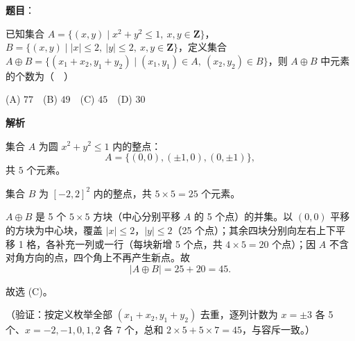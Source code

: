 \begin{answer}

\textbf{题目}：

已知集合 \(A=\{(x,y)\mid x^2+y^2\leqslant1,\ x,y\in\mathbf{Z}\}\)，\(B=\{(x,y)\mid |x|\leqslant2,\ |y|\leqslant2,\ x,y\in\mathbf{Z}\}\)，定义集合 \(A\oplus B=\{(x_1+x_2,y_1+y_2)\mid (x_1,y_1)\in A,\ (x_2,y_2)\in B\}\)，则 \(A\oplus B\) 中元素的个数为（　）

(A) \(77\)　(B) \(49\)　(C) \(45\)　(D) \(30\)

\textbf{解析}

集合 \(A\) 为圆 \(x^2+y^2\leqslant1\) 内的整点：
\nopagebreak[4]
\[
A=\{(0,0),(\pm1,0),(0,\pm1)\},
\]
共 \(5\) 个元素。

集合 \(B\) 为 \([-2,2]^2\) 内的整点，共 \(5\times5=25\) 个元素。

\(A\oplus B\) 是 5 个 \(5\times5\) 方块（中心分别平移 \(A\) 的 5 个点）的并集。以 \((0,0)\) 平移的方块为中心块，覆盖 \(|x|\leqslant2\)，\(|y|\leqslant2\)（25 个点）；其余四块分别向左右上下平移 1 格，各补充一列或一行（每块新增 5 个点，共 \(4\times5=20\) 个点）；因 \(A\) 不含对角方向的点，四个角上不再产生新点。故
\nopagebreak[4]
\[
|A\oplus B|=25+20=45.
\]

故选 (C)。

（验证：按定义枚举全部 \((x_1+x_2,y_1+y_2)\) 去重，逐列计数为 \(x=\pm3\) 各 5 个、\(x=-2,-1,0,1,2\) 各 7 个，总和 \(2\times5+5\times7=45\)，与容斥一致。）


\end{answer}
